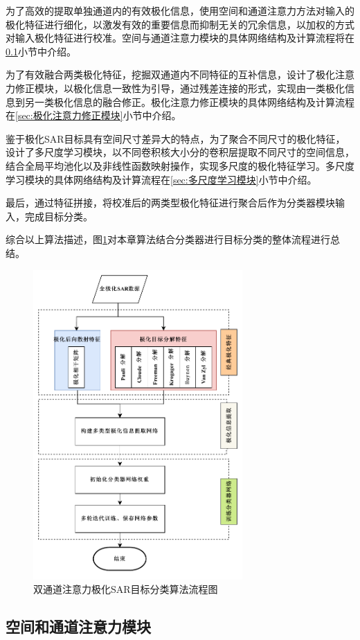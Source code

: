 为了高效的提取单独通道内的有效极化信息，使用空间和通道注意力方法对输入的极化特征进行细化，以激发有效的重要信息而抑制无关的冗余信息，以加权的方式对输入极化特征进行校准。空间与通道注意力模块的具体网络结构及计算流程将在\ref{sec:空间和通道注意力模块}小节中介绍。

为了有效融合两类极化特征，挖掘双通道内不同特征的互补信息，设计了极化注意力修正模块，以极化信息一致性为引导，通过残差连接的形式，实现由一类极化信息到另一类极化信息的融合修正。极化注意力修正模块的具体网络结构及计算流程在\ref{sec:极化注意力修正模块}小节中介绍。

鉴于极化SAR目标具有空间尺寸差异大的特点，为了聚合不同尺寸的极化特征，设计了多尺度学习模块，以不同卷积核大小分的卷积层提取不同尺寸的空间信息，结合全局平均池化以及非线性函数映射操作，实现多尺度的极化特征学习。多尺度学习模块的具体网络结构及计算流程在\ref{sec:多尺度学习模块}小节中介绍。

最后，通过特征拼接，将校准后的两类型极化特征进行聚合后作为分类器模块输入，完成目标分类。

综合以上算法描述，图\ref{流程图}对本章算法结合分类器进行目标分类的整体流程进行总结。
\begin{figure}[ht!]
    \centering
    \includegraphics[width=8cm]{pic/chapter3/DP流程图.pdf}
    \caption{双通道注意力极化SAR目标分类算法流程图}
    \label{流程图}
\end{figure}

\subsection{空间和通道注意力模块}
\label{sec:空间和通道注意力模块}

